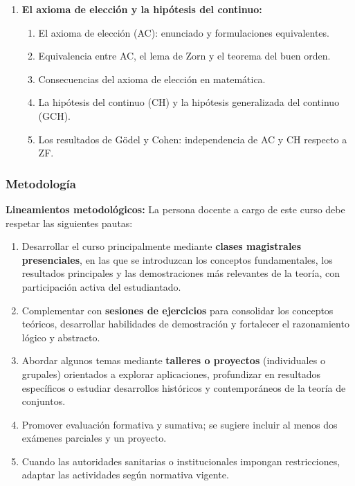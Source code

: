 \begin{refsection}
\begin{enumerate}
\item \textbf{El axioma de elección y la hipótesis del continuo:}
\begin{enumerate}
    \item El axioma de elección (AC): enunciado y formulaciones equivalentes.
    \item Equivalencia entre AC, el lema de Zorn y el teorema del buen orden.
    \item Consecuencias del axioma de elección en matemática.
    \item La hipótesis del continuo (CH) y la hipótesis generalizada del continuo (GCH).
    \item Los resultados de Gödel y Cohen: independencia de AC y CH respecto a ZF.
\end{enumerate}

\end{enumerate}

\subsubsection*{Metodología}

\noindent \textbf{Lineamientos metodológicos:} La persona docente a cargo de este curso debe respetar las siguientes pautas:

\begin{enumerate}
    \item Desarrollar el curso principalmente mediante \textbf{clases magistrales presenciales}, en las que se introduzcan los conceptos fundamentales, los resultados principales y las demostraciones más relevantes de la teoría, con participación activa del estudiantado.
    \item Complementar con \textbf{sesiones de ejercicios} para consolidar los conceptos teóricos, desarrollar habilidades de demostración y fortalecer el razonamiento lógico y abstracto.
    \item Abordar algunos temas mediante \textbf{talleres o proyectos} (individuales o grupales) orientados a explorar aplicaciones, profundizar en resultados específicos o estudiar desarrollos históricos y contemporáneos de la teoría de conjuntos.
    \item Promover evaluación formativa y sumativa; se sugiere incluir al menos dos exámenes parciales y un proyecto.
    \item Cuando las autoridades sanitarias o institucionales impongan restricciones, adaptar las actividades según normativa vigente.
\end{enumerate}


\end{refsection}
